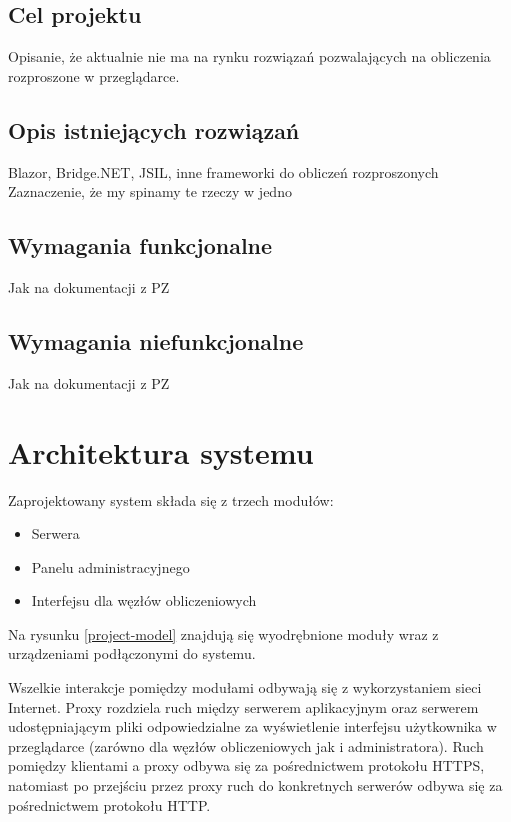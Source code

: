\documentclass[a4paper,11pt,twoside]{report}
\theoremstyle{definition}
\begin{document}
    \section{Cel projektu}
        Opisanie, że aktualnie nie ma na rynku rozwiązań pozwalających na obliczenia rozproszone w przeglądarce.
    
    \section{Opis istniejących rozwiązań}
        Blazor, Bridge.NET, JSIL, inne frameworki do obliczeń rozproszonych
        Zaznaczenie, że my spinamy te rzeczy w jedno
        
    \section{Wymagania funkcjonalne}
        Jak na dokumentacji z PZ
        
    \section{Wymagania niefunkcjonalne}
        Jak na dokumentacji z PZ
    
\chapter{Architektura systemu}
 Zaprojektowany system składa się z trzech modułów:

\begin{itemize}
	\item Serwera
	\item Panelu administracyjnego
	\item Interfejsu dla węzłów obliczeniowych
\end{itemize}

Na rysunku \ref{project-model} znajdują się wyodrębnione moduły wraz z urządzeniami podłączonymi do systemu.

Wszelkie interakcje pomiędzy modułami odbywają się z wykorzystaniem sieci Internet. Proxy rozdziela ruch między serwerem aplikacyjnym oraz serwerem udostępniającym pliki odpowiedzialne za wyświetlenie interfejsu użytkownika w przeglądarce (zarówno dla węzłów obliczeniowych jak i administratora). Ruch pomiędzy klientami a proxy odbywa się za pośrednictwem protokołu HTTPS, natomiast po przejściu przez proxy ruch do konkretnych serwerów odbywa się za pośrednictwem protokołu HTTP.
\end{document}
